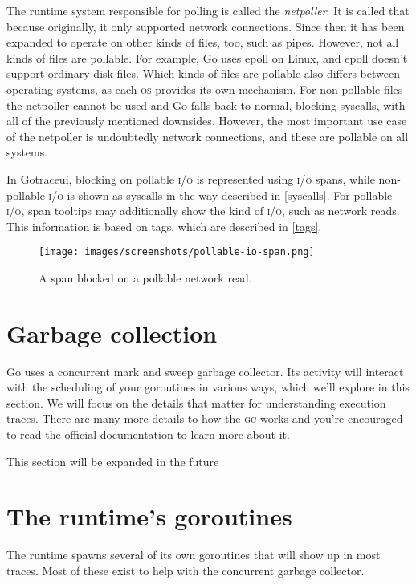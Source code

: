 \documentclass[10pt,letterpaper,oneside,openany,english]{memoir}
\newcommand{\todo}[1]{{\color{red}#1}}
\begin{document}
The runtime system responsible for polling is called the \emph{netpoller}. It is called that because originally, it only supported network connections.
Since then it has been expanded to operate on other kinds of files, too, such as pipes.
However, not all kinds of files are pollable. For example, Go uses epoll on Linux, and epoll doesn't support ordinary disk files.
Which kinds of files are pollable also differs between operating systems, as each \textsc{os} provides its own mechanism.
For non-pollable files the netpoller cannot be used and Go falls back to normal, blocking syscalls, with all of the previously mentioned downsides.
However, the most important use case of the netpoller is undoubtedly network connections, and these are pollable on all systems.

In Gotraceui, blocking on pollable \textsc{i/o} is represented using \textsc{i/o} spans, while non-pollable \textsc{i/o} is shown as syscalls in the way described in \cref{syscalls}.
For pollable \textsc{i/o}, span tooltips may additionally show the kind of \textsc{i/o}, such as network reads. This information is based on tags, which are described in \cref{tags}.

\begin{figure}[h]
  \centering
  \texttt{[image: images/screenshots/pollable-io-span.png]}
  \caption{A span blocked on a pollable network read.}
\end{figure}

\section{Garbage collection}\label{gc}
Go uses a concurrent mark and sweep garbage collector.
Its activity will interact with the scheduling of your goroutines in various ways,
which we'll explore in this section.
We will focus on the details that matter for understanding execution traces.
There are many more details to how the \textsc{gc} works
and you're encouraged to read the \href{https://go.dev/doc/gc-guide}{official documentation}\cite{GuideGoGarbage} to learn more about it.


\todo{This section will be expanded in the future}

\section{The runtime's goroutines}
The runtime spawns several of its own goroutines that will show up in most traces.
Most of these exist to help with the concurrent garbage collector.
\end{document}
